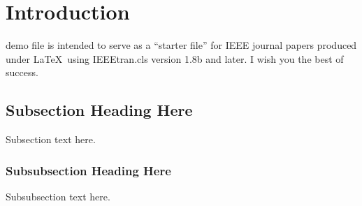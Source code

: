 \section{Introduction}

 demo file is intended to serve as a ``starter file''
for IEEE journal papers produced under \LaTeX\ using
IEEEtran.cls version 1.8b and later.
I wish you the best of success.



\subsection{Subsection Heading Here}
Subsection text here.


\subsubsection{Subsubsection Heading Here}
Subsubsection text here.

